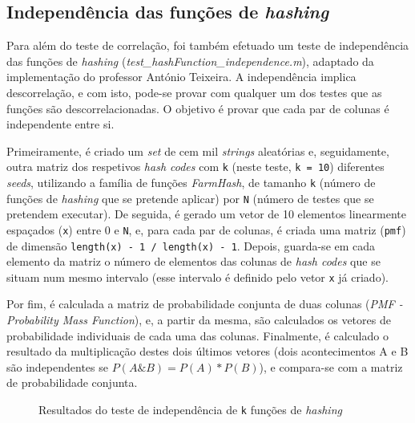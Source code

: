 \documentclass[a4paper,11pt,openright,oneside]{report}
\begin{document}
\subsection{Independência das funções de \textit{hashing}}
\label{subsec.hashindep}

Para além do teste de correlação, foi também efetuado um teste de independência das funções de \textit{hashing} (\textit{test\_hashFunction\_independence.m}), adaptado da implementação do professor António Teixeira. A independência implica descorrelação, e com isto, pode-se provar com qualquer um dos testes que as funções são descorrelacionadas. O objetivo é provar que cada par de colunas é independente entre si.

Primeiramente, é criado um \textit{set} de cem mil \textit{strings} aleatórias e, seguidamente, outra matriz dos respetivos \textit{hash codes} com \texttt{k} (neste teste, \texttt{k = 10}) diferentes \textit{seeds}, utilizando a família de funções \textit{FarmHash}, de tamanho \texttt{k} (número de funções de \textit{hashing} que se pretende aplicar) por \texttt{N} (número de testes que se pretendem executar). De seguida, é gerado um vetor de 10 elementos linearmente espaçados (\texttt{x}) entre 0 e \texttt{N}, e, para cada par de colunas, é criada uma matriz (\texttt{pmf}) de dimensão \texttt{length(x) - 1 / length(x) - 1}. Depois, guarda-se em cada elemento da matriz o número de elementos das colunas de \textit{hash codes} que se situam num mesmo intervalo (esse intervalo é definido pelo vetor \texttt{x} já criado).

Por fim, é calculada a matriz de probabilidade conjunta de duas colunas (\textit{PMF - Probability Mass Function}), e, a partir da mesma, são calculados os vetores de probabilidade individuais de cada uma das colunas. Finalmente, é calculado o resultado da multiplicação destes dois últimos vetores (dois acontecimentos A e B são independentes se $P(A\&B) = P(A) * P(B)$), e compara-se com a matriz de probabilidade conjunta.

\begin{figure}[ht]	
\center
{}
\caption{Resultados do teste de independência de \texttt{k} funções de \textit{hashing}}
\label{fig:hashindep}
\end{figure}
\end{document}
